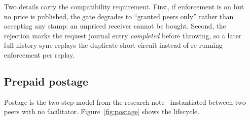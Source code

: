 Two details carry the compatibility requirement. First, if enforcement is on but no
 price is published, the gate degrades to ``granted peers only'' rather
than accepting any stamp: an unpriced receiver cannot be bought. Second, the rejection
marks the request journal entry \emph{completed} before throwing, so a later full-history
sync replays the duplicate short-circuit instead of re-running enforcement per replay.

\subsection{Prepaid postage}
\label{sec:design-postage}

Postage is the two-step model from the research note~\cite{tap-research-note}
instantiated between two peers with no facilitator. Figure~\ref{fig:postage} shows the
lifecycle.

